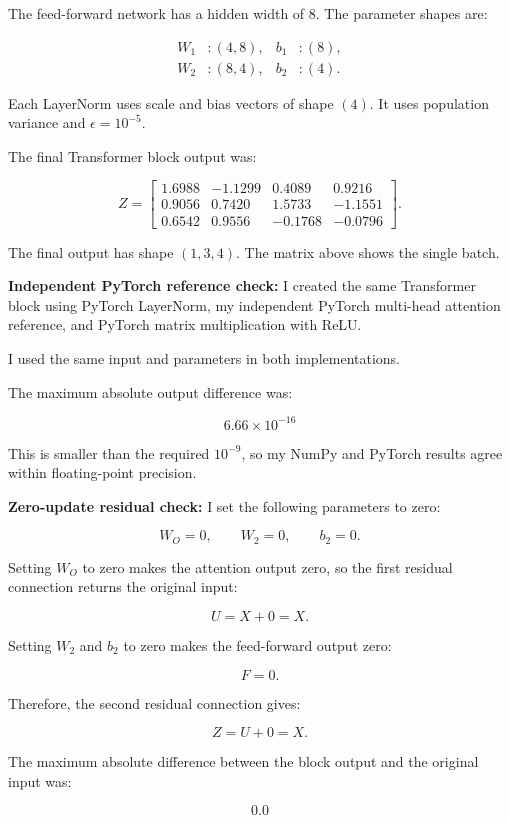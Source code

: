 \documentclass[11pt]{article}
\begin{document}
The feed-forward network has a hidden width of 8.
The parameter shapes are:

\[
\begin{aligned}
W_1 &: (4,8), & b_1 &: (8),\\
W_2 &: (8,4), & b_2 &: (4).
\end{aligned}
\]

Each LayerNorm uses scale and bias vectors
of shape $(4)$. It uses population variance
and $\epsilon=10^{-5}$.

The final Transformer block output was:

\[
Z=
\begin{bmatrix}
1.6988 & -1.1299 & 0.4089 & 0.9216\\
0.9056 & 0.7420 & 1.5733 & -1.1551\\
0.6542 & 0.9556 & -0.1768 & -0.0796
\end{bmatrix}.
\]

The final output has shape $(1,3,4)$.
The matrix above shows the single batch.

\textbf{Independent PyTorch reference check:} I created the same Transformer block using
PyTorch LayerNorm, my independent PyTorch multi-head attention reference, and PyTorch matrix multiplication with ReLU.

I used the same input and parameters in both
implementations.

The maximum absolute output difference was:

\[
\boxed{6.66\times10^{-16}}
\]

This is smaller than the required $10^{-9}$,
so my NumPy and PyTorch results agree within
floating-point precision.

\textbf{Zero-update residual check:} I set the following parameters to zero:

\[
W_O=0,\qquad W_2=0,\qquad b_2=0.
\]

Setting $W_O$ to zero makes the attention
output zero, so the first residual connection
returns the original input:

\[
U=X+0=X.
\]

Setting $W_2$ and $b_2$ to zero makes the
feed-forward output zero:

\[
F=0.
\]

Therefore, the second residual connection gives:

\[
Z=U+0=X.
\]

The maximum absolute difference between
the block output and the original input was:

\[
\boxed{0.0}
\]
\end{document}

